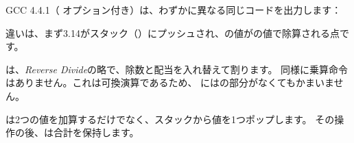 ﻿

GCC 4.4.1（ \Othree オプション付き）は、わずかに異なる同じコードを出力します：



違いは、まず3.14がスタック（）にプッシュされ、の値がの値で除算される点です。


\FDIVR は、\emph{Reverse Divide}の略で、除数と配当を入れ替えて割ります。 
同様に乗算命令はありません。これは可換演算であるため、 \FMUL にはの部分がなくてもかまいません。


\FADDP は2つの値を加算するだけでなく、スタックから値を1つポップします。 
その操作の後、は合計を保持します。
